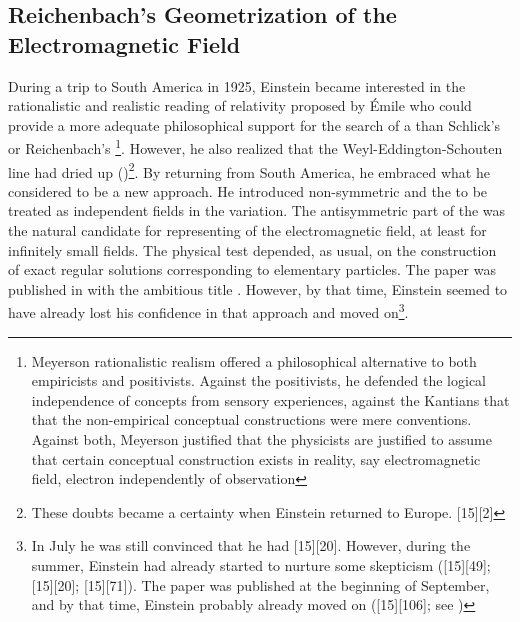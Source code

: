 \documentclass[draft]{article}
\begin{document}
\subsection{Reichenbach's Geometrization of the Electromagnetic Field}
%
During a trip to South America in 1925, Einstein became interested in the rationalistic and realistic reading of relativity proposed by \'Emile   who could provide a more adequate philosophical support for the search of a \uft than Schlick's or Reichenbach's \footnote{Meyerson rationalistic realism offered a philosophical alternative to both empiricists and positivists. Against the positivists, he defended the logical independence of concepts from sensory experiences, against the Kantians that that the non-empirical  conceptual constructions were mere conventions. Against both, Meyerson justified that the physicists are justified to assume that certain conceptual construction exists in reality, say electromagnetic field, electron independently of observation}. However, he also realized that the Weyl-Eddington-Schouten line had dried up ()\footnote{These doubts became a certainty when Einstein returned to Europe.  [15][2]}. By returning from South America, he embraced what he considered to be a new approach. He introduced non-symmetric \Gtmn and the \gmn to be treated as independent fields in the variation. The antisymmetric part of the \gmn was the natural candidate for representing of the electromagnetic field, at least for infinitely small fields. The physical test depended, as usual, on the construction of exact regular solutions corresponding to elementary particles. The paper was published in  with the ambitious title   \citep{Einstein1925}. However, by that time, Einstein seemed to have already lost his confidence in that approach and moved on\footnote{In July he was still convinced that he had  [15][20]. However, during the summer, Einstein had already started to nurture some skepticism ([15][49]; [15][20]; [15][71]). The paper was published at the beginning of September, and by that time, Einstein probably already moved on ([15][106]; see \cite{Einstein1927c})}.
\end{document}
